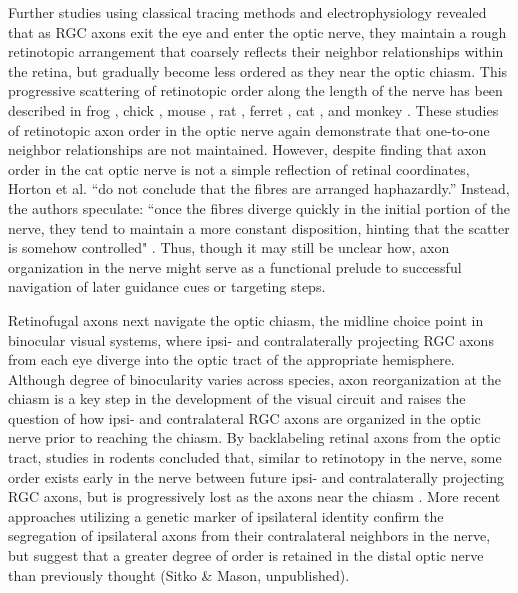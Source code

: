 Further studies using classical tracing methods and electrophysiology revealed that as RGC axons exit the eye and enter the optic nerve, they maintain a rough retinotopic arrangement that coarsely reflects their neighbor relationships within the retina, but gradually become less ordered as they near the optic chiasm. 
This progressive scattering of retinotopic order along the length of the nerve has been described in frog \cite{montgomery1998organization}, chick \cite{ehrlich1984course}, mouse \cite{chan1999changes, plas2005pretarget}, rat \cite{chan1994changes, simon1991relationship}, ferret \cite{reese1993reestablishment}, cat \cite{horton1979non, naito1986course}, and monkey \cite{naito1994retinogeniculate}. 
These studies of retinotopic axon order in the optic nerve again demonstrate that one-to-one neighbor relationships are not maintained.
However, despite finding that axon order in the cat optic nerve is not a simple reflection of retinal coordinates, Horton et al. “do not conclude that the fibres are arranged haphazardly.” 
Instead, the authors speculate: “once the fibres diverge quickly in the initial portion of the nerve, they tend to maintain a more constant disposition, hinting that the scatter is somehow controlled" \cite{horton1979non}. 
Thus, though it may still be unclear how, axon organization in the nerve might serve as a functional prelude to successful navigation of later guidance cues or targeting steps.

Retinofugal axons next navigate the optic chiasm, the midline choice point in binocular visual systems, where ipsi- and contralaterally projecting RGC axons from each eye diverge into the optic tract of the appropriate hemisphere.
Although degree of binocularity varies across species, axon reorganization at the chiasm is a key step in the development of the visual circuit and raises the question of how ipsi- and contralateral RGC axons are organized in the optic nerve prior to reaching the chiasm. 
By backlabeling retinal axons from the optic tract, studies in rodents concluded that, similar to retinotopy in the nerve, some order exists early in the nerve between future ipsi- and contralaterally projecting RGC axons, but is progressively lost as the axons near the chiasm \cite{baker1989distribution, colello1990early}. 
More recent approaches utilizing a genetic marker of ipsilateral identity confirm the segregation of ipsilateral axons from their contralateral neighbors in the nerve, but suggest that a greater degree of order is retained in the distal optic nerve than previously thought (Sitko & Mason, unpublished). 

